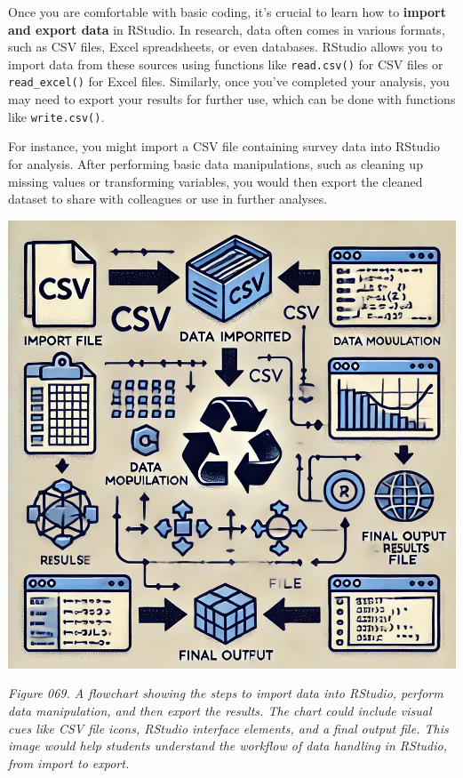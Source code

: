 \documentclass[
]{book}
\begin{document}
Once you are comfortable with basic coding, it's crucial to learn how to \textbf{import and export data} in RStudio. In research, data often comes in various formats, such as CSV files, Excel spreadsheets, or even databases. RStudio allows you to import data from these sources using functions like \texttt{read.csv()} for CSV files or \texttt{read\_excel()} for Excel files. Similarly, once you've completed your analysis, you may need to export your results for further use, which can be done with functions like \texttt{write.csv()}.

For instance, you might import a CSV file containing survey data into RStudio for analysis. After performing basic data manipulations, such as cleaning up missing values or transforming variables, you would then export the cleaned dataset to share with colleagues or use in further analyses.

\includegraphics[width=1\textwidth,height=\textheight]{images/fig069.jpg}

\emph{Figure 069. A flowchart showing the steps to import data into RStudio, perform data manipulation, and then export the results. The chart could include visual cues like CSV file icons, RStudio interface elements, and a final output file. This image would help students understand the workflow of data handling in RStudio, from import to export.}
\end{document}
